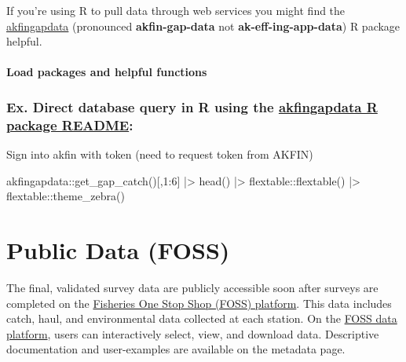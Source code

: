 \documentclass[
  letterpaper,
  oneside,
  open=any]{scrbook}
\newenvironment{Shaded}{\begin{snugshade}}{\end{snugshade}}
\newcommand{\DecValTok}[1]{\textcolor[rgb]{0.68,0.00,0.00}{#1}}
\newcommand{\FunctionTok}[1]{\textcolor[rgb]{0.28,0.35,0.67}{#1}}
\newcommand{\NormalTok}[1]{\textcolor[rgb]{0.00,0.23,0.31}{#1}}
\newcommand{\SpecialCharTok}[1]{\textcolor[rgb]{0.37,0.37,0.37}{#1}}
\begin{document}
If you're using R to pull data through web services you might find the
\href{https://github.com/MattCallahan-NOAA/akfingapdata/tree/main}{akfingapdata}
(pronounced \textbf{akfin-gap-data} not \textbf{ak-eff-ing-app-data}) R
package helpful.

\subsection{Load packages and helpful
functions}\label{load-packages-and-helpful-functions}

\section{\texorpdfstring{Ex. Direct database query in R using the
\href{https://github.com/MattCallahan-NOAA/akfingapdata/blob/main/README.Rmd}{akfingapdata
R package
README}:}{Ex. Direct database query in R using the akfingapdata R package README:}}\label{ex.-direct-database-query-in-r-using-the-akfingapdata-r-package-readme}

Sign into akfin with token (need to request token from AKFIN)

\begin{Shaded}
\begin{Highlighting}[]
\NormalTok{akfingapdata}\SpecialCharTok{::}\FunctionTok{get\_gap\_catch}\NormalTok{()[,}\DecValTok{1}\SpecialCharTok{:}\DecValTok{6}\NormalTok{] }\SpecialCharTok{|\textgreater{}} 
  \FunctionTok{head}\NormalTok{() }\SpecialCharTok{|\textgreater{}} 
\NormalTok{  flextable}\SpecialCharTok{::}\FunctionTok{flextable}\NormalTok{() }\SpecialCharTok{|\textgreater{}}
\NormalTok{  flextable}\SpecialCharTok{::}\FunctionTok{theme\_zebra}\NormalTok{()}
\end{Highlighting}
\end{Shaded}

\part{Public Data (FOSS)}

The final, validated survey data are publicly accessible soon after
surveys are completed on the
\href{https://www.fisheries.noaa.gov/foss/}{Fisheries One Stop Shop
(FOSS) platform}. This data includes catch, haul, and environmental data
collected at each station. On the
\href{https://www.fisheries.noaa.gov/foss/}{FOSS data platform}, users
can interactively select, view, and download data. Descriptive
documentation and user-examples are available on the metadata page.
\end{document}

